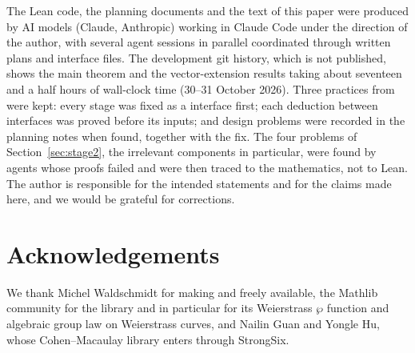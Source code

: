 \documentclass[11pt]{amsart}
\theoremstyle{definition}
\theoremstyle{remark}
\numberwithin{equation}{section}
\begin{document}
The Lean code, the planning documents and the text of this paper were produced by AI models (Claude,
Anthropic) working in Claude Code under the direction of the author, with several agent sessions in
parallel coordinated through written plans and interface files. The development git history, which is not published,
shows the main theorem and the vector-extension results taking about seventeen and a half hours of wall-clock time
(30--31 October 2026). Three practices from \cite{StrongSixPaper} were kept: every stage was fixed as a 
interface first; each deduction between interfaces was proved before its inputs; and design problems
were recorded in the planning notes when found, together with the fix. The four problems of
Section~\ref{sec:stage2}, the irrelevant components in particular, were found by agents whose proofs failed
and were then traced to the mathematics, not to Lean. The author is responsible for the intended statements
and for the claims made here, and we would be grateful for corrections.

\section*{Acknowledgements}

We thank Michel Waldschmidt for making \cite{DALAG} and \cite{WaldschmidtLIL} freely available, the
Mathlib community for the library and in particular for its Weierstrass $\wp$ function and algebraic group
law on Weierstrass curves, and Nailin Guan and Yongle Hu, whose Cohen--Macaulay library enters through
StrongSix.


{\raggedright\par}
\end{document}
